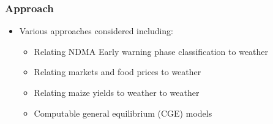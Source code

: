 \documentclass{beamer}              %
\begin{document}
\begin{frame}\label{Approaches00}
\frametitle{Approach} 


\begin{itemize}
\item Various approaches considered including:

\begin{itemize}
\item Relating NDMA Early warning phase classification to weather
\item Relating markets and food prices to weather
\item Relating maize yields to weather to weather
\item Computable general equilibrium (CGE) models
\end{itemize}
\end{itemize}
\end{frame}

\end{document}
